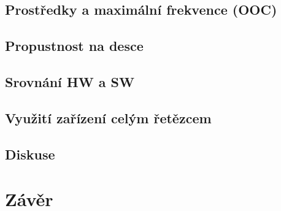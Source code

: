 \documentclass[FM,DP]{tulthesis}
\begin{document}
\section{Prostředky a maximální frekvence (OOC)}

\section{Propustnost na desce}

\section{Srovnání HW a SW}

\section{Využití zařízení celým řetězcem}

\section{Diskuse}

\chapter{Závěr}

\printbibliography[title={Použitá literatura},heading=bibintoc]
\end{document}
